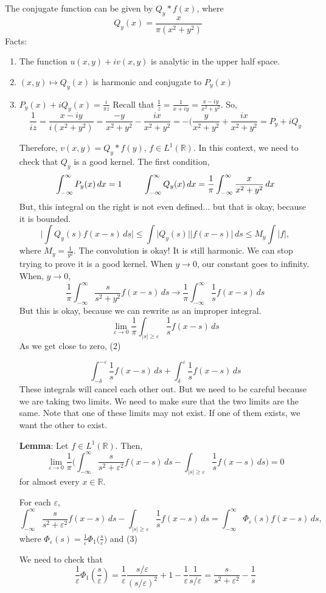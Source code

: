 \documentclass[12pt]{article}
\begin{document}
The conjugate function can be given by $Q_y * f(x)$, where 
$$Q_y(x) = \frac{x}{\pi(x^2+y^2)}$$
Facts: 
\begin{enumerate}
\item The function $u(x,y) + iv(x,y)$ is analytic in the upper half space.
\item $(x,y) \mapsto Q_y(x)$ is harmonic and conjugate to $P_y(x)$
\item $P_y(x) + i Q_y(x) = \frac{i}{\pi z}$
Recall that $\frac{1}{z} = \frac{1}{x+iy} = \frac{x-iy}{x^2+y^2}$. So,
$$\frac{1}{ i z} = \frac{x-iy}{ i(x^2 + y^2)} = \frac{-y}{x^2+y^2} - \frac{ix}{x^2+y^2} = -\Big( \frac{y}{x^2+y^2} + \frac{ix}{x^2+y^2} = P_y + iQ_y$$

Therefore, $v(x,y) = Q_y * f(y)$, $f \in L^1(\mathbb{R})$. In this context, we need to check that $Q_y$ is a good kernel. The first condition,
$$\int^\infty_{-\infty} P_y(x) \,dx = 1 \hspace*{25pt} \int^\infty_{-\infty} Q_y(x) \, dx = \frac{1}{\pi} \int^\infty_{-\infty} \frac{x}{x^2+y^2} \, dx$$
But, this integral on the right is not even defined... but that is okay, because it is bounded.
$$ \vert \int Q_y(s) f(x-s) \,ds \vert \leq \int \vert Q_y(s) \vert \vert f(x-s) \vert \, ds \leq M_y \int \vert f \vert,$$
where $M_y = \frac{1}{y^2}$. The convolution is okay! It is still harmonic. We can stop trying to prove it is a good kernel. When $y \rightarrow 0$, our constant goes to infinity. When, $y \rightarrow 0$,
$$\frac{1}{\pi} \int^\infty_{-\infty} \frac{s}{s^2+y^2} f(x-s) \,ds \rightarrow \frac{1}{\pi} \int^\infty_{-\infty} \frac{1}{s} f(x-s) \, ds$$
But this is okay, because we can rewrite as an improper integral.
$$\lim_{\varepsilon \rightarrow 0} \frac{1}{\pi} \int_{\vert s \vert \geq \varepsilon} \frac{1}{s} f(x-s) \,ds$$
As we get close to zero, 
(2)

$$\int^{-\varepsilon}_{-\delta} \frac{1}{s} f(x-s) \,ds + \int^{\varepsilon}_{\delta} \frac{1}{s} f(x-s) \,ds$$
These integrals will cancel each other out. But we need to be careful because we are taking two limits. We need to make sure that the two limits are the same. Note that one of these limits may not exist. If one of them exists, we want the other to exist. 

\noindent \textbf{Lemma}: Let $f \in L^1(\mathbb{R})$. Then, 
$$\lim_{\varepsilon\rightarrow 0} \frac{1}{\pi} \Big( \int^\infty_{-\infty} \frac{s}{s^2 + \varepsilon^2} f(x-s) \,ds - \int_{\vert s \vert \geq \varepsilon} \frac{1}{s} f(x-s) \,ds\Big) =0$$
for almost every $x \in \mathbb{R}$.

\noindent For each $\varepsilon$, 
$$\int^\infty_{-\infty} \frac{s}{s^2 + \varepsilon^2} f(x-s) \,ds - \int_{\vert s \vert \geq \varepsilon} \frac{1}{s} f(x-s) \,ds = \int^\infty_{-\infty} \Phi_\varepsilon(s) f(x-s) \,ds,$$
where $\Phi_\varepsilon(s) = \frac{1}{\varepsilon} \Phi_1 \Big(\frac{s}{\varepsilon}\Big)$ and
(3)

We need to check that 
$$\frac{1}{\varepsilon} \Phi_1 (\frac{s}{\varepsilon}) = \frac{1}{\varepsilon} \frac{ s/\varepsilon}{(s/\varepsilon)^2}+1 - \frac{1}{\varepsilon} \frac{1}{s/\varepsilon} = \frac{s}{s^2+\varepsilon^2} - \frac{1}{s}$$
\end{enumerate}
\end{document}
